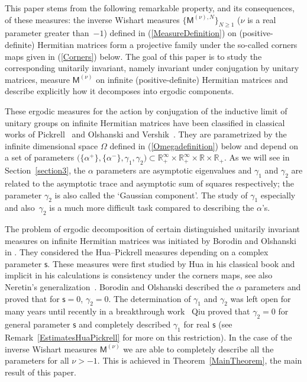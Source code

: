 \documentclass[pdftex]{sigma}
\numberwithin{equation}{section}
\begin{document}
This paper stems from the following remarkable property, and its consequences, of these measures: the inverse Wishart measures $\big\{\mathsf{M}^{(\nu),N}\big\}_{N\ge 1}$ ($\nu$ is a real parameter greater than~$-1$) defined in (\ref{MeasureDefinition}) on (positive-definite) Hermitian matrices form a projective family under the so-called corners maps given in (\ref{Corners}) below. The goal of this paper is to study the corresponding unitarily invariant, namely invariant under conjugation by unitary matrices, measure $\mathsf{M}^{(\nu)}$ on infinite (positive-definite) Hermitian matrices and describe explicitly how it decomposes into ergodic components.

These ergodic measures for the action by conjugation of the inductive limit of unitary groups on infinite Hermitian matrices have been classified in classical works of Pickrell~\cite{Pickrell} and Olshanski and Vershik~\cite{OlshanskiVershik}. They are parametrized by the infinite dimensional space $\Omega$ defined in (\ref{Omegadefinition}) below and depend on a set of parameters $\big(\{\alpha^+\},\{\alpha^-\},\gamma_1,\gamma_2\big)\subset \mathbb{R}_+^{\infty}\times \mathbb{R}_+^{\infty}\times\mathbb{R}\times\mathbb{R}_+$. As we will see in Section~\ref{section3}, the $\alpha$ parameters are asymptotic eigenvalues and $\gamma_1$ and $\gamma_2$ are related to the asymptotic trace and asymptotic sum of squares respectively; the parameter $\gamma_2$ is also called the `Gaussian component'. The study of $\gamma_1$ especially and also~$\gamma_2$ is a much more difficult task compared to describing the $\alpha$'s.

The problem of ergodic decomposition of certain distinguished unitarily invariant measures on infinite Hermitian matrices was initiated by Borodin and Olshanski in \cite{BorodinOlshanskiErgodic}. They considered the Hua--Pickrell measures depending on a complex parameter $\mathsf{s}$. These measures were first studied by Hua in his classical book \cite{Hua} and implicit in his calculations is consistency under the corners maps, see also Neretin's generalization~\cite{Neretin}. Borodin and Olshanski described the $\alpha$ parameters and proved that for $\mathsf{s}=0$, $\gamma_2=0$. The determination of $\gamma_1$ and $\gamma_2$ was left open for many years until recently in a breakthrough work~\cite{Qiu} Qiu proved that $\gamma_2=0$ for general parameter $\mathsf{s}$ and completely described $\gamma_1$ for real $\mathsf{s}$ (see Remark~\ref{EstimatesHuaPickrell} for more on this restriction). In the case of the inverse Wishart measures $\mathsf{M}^{(\nu)}$ we are able to completely describe all the parameters for all $\nu>-1$. This is achieved in Theorem~\ref{MainTheorem}, the main result of this paper.
\end{document}
